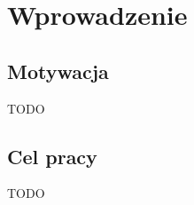 \chapter{Wprowadzenie}

\section[Tytuł w paginie][Tytuł w spisie treści]{Motywacja}
TODO
\section[Tytuł w paginie][Tytuł w spisie treści]{Cel pracy}
TODO
